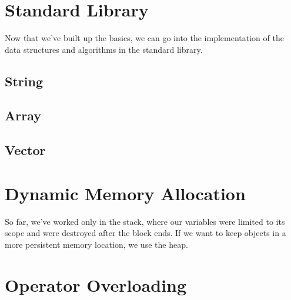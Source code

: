 \documentclass{article}
\begin{document}
    \begin{definition}
      
    \end{definition}


\section{Standard Library} 

    Now that we've built up the basics, we can go into the implementation of the data structures and algorithms in the standard library. 

  \subsection{String}

  \subsection{Array}

  \subsection{Vector}

\section{Dynamic Memory Allocation} 

  So far, we've worked only in the stack, where our variables were limited to its scope and were destroyed after the block ends. If we want to keep objects in a more persistent memory location, we use the heap.  

\section{Operator Overloading} 
\end{document}
